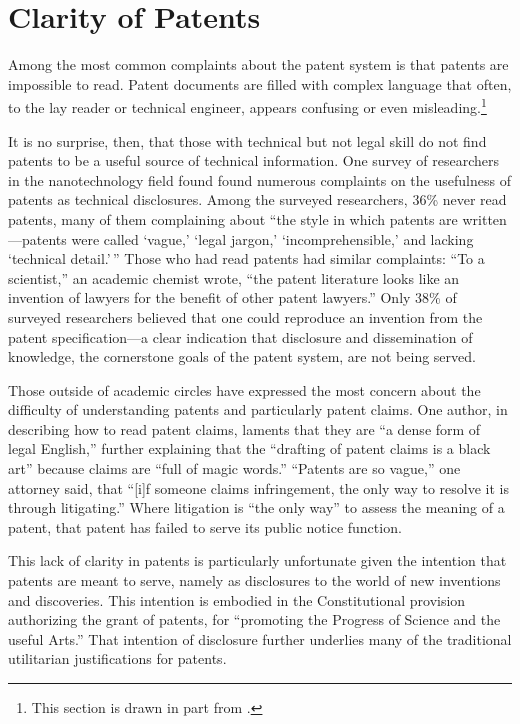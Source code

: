 \documentclass[11pt,twocolumn,titlepage]{article}
\begin{document}
\section{Clarity of Patents}
\SectionNote
{}

Among the most common complaints about the patent system is that patents are
impossible to read. Patent documents are filled with complex language that
often, to the lay reader or technical engineer, appears confusing or even
misleading.\footnote{This section is drawn in part from
.}

It is no surprise, then, that those with technical but not legal skill do not
find patents to be a useful source of technical information. One survey of
researchers in the nanotechnology field found found numerous complaints on the
usefulness of patents as technical disclosures. Among the
surveyed researchers, 36\% never read patents, many of them complaining about
``the style in which patents are written---patents were called `vague,' `legal
jargon,' `incomprehensible,' and lacking `technical detail.'\,'' Those who had read patents had similar complaints: ``To a scientist,''
an academic chemist wrote, ``the patent literature looks like an invention of
lawyers for the benefit of other patent lawyers.'' Only
38\% of surveyed researchers believed that one could reproduce an invention from
the patent specification---a clear indication that disclosure and dissemination
of knowledge, the cornerstone goals of the patent system, are not being
served.

Those outside of academic circles have expressed the most concern about the
difficulty of understanding patents and particularly patent claims. One author,
in describing how to read patent claims, laments that they are ``a dense form
of legal English,'' further explaining that the ``drafting of patent claims is a
black art'' because claims are ``full of magic words.''
``Patents are so vague,'' one attorney said, that ``[i]f someone claims
infringement, the only way to resolve it is through
litigating.'' Where litigation is ``the only way'' to assess
the meaning
of a patent, that patent has failed to serve its public notice function.

This lack of clarity in patents is particularly unfortunate given the intention
that patents are meant to serve, namely as disclosures to the world of new
inventions and discoveries. This intention is embodied in the Constitutional
provision authorizing the grant of patents, for ``promoting the Progress of
Science and the useful Arts.''  That intention of disclosure
further underlies many of the traditional utilitarian justifications for
patents.
\end{document}
